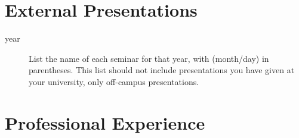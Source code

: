 \documentclass[12pt]{safecv}%
\begin{document}
\section*{External Presentations}
%
\begin{description}
\item[year] List the name of each seminar for that year, with
(month/day) in parentheses. This list should not include presentations
you have given at your university, only off-campus presentations.
\end{description}

\section*{Professional Experience}
%
%
%
%
\end{document}
